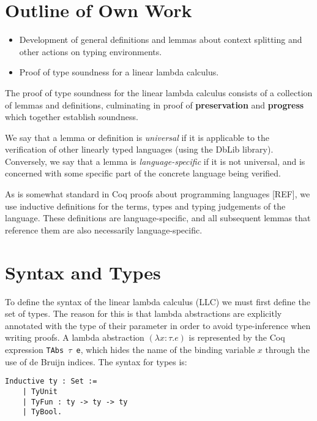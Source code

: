 \documentclass[]{unswthesis}
\let\c\texttt
\let\i\textit
\begin{document}
\section{Outline of Own Work}

\begin{itemize}
\item Development of general definitions and lemmas about context splitting and other actions on typing environments.
\item Proof of type soundness for a linear lambda calculus.
\end{itemize}

The proof of type soundness for the linear lambda calculus consists of a collection of lemmas and definitions, culminating in proof of \textbf{preservation} and \textbf{progress} which together establish soundness.

We say that a lemma or definition is \i{universal} if it is applicable to the verification of other linearly typed languages (using the DbLib library). Conversely, we say that a lemma is \i{language-specific} if it is not universal, and is concerned with some specific part of the concrete language being verified.

As is somewhat standard in Coq proofs about programming languages [REF], we use inductive definitions for the terms, types and typing judgements of the language. These definitions are language-specific, and all subsequent lemmas that reference them are also necessarily language-specific.


\section{Syntax and Types}

To define the syntax of the linear lambda calculus (LLC) we must first define the set of types. The reason for this is that lambda abstractions are explicitly annotated with the type of their parameter in order to avoid type-inference when writing proofs. A lambda abstraction $(\lambda x : \tau. e)$ is represented by the Coq expression \c{TAbs $\tau$ e}, which hides the name of the binding variable $x$ through the use of de Bruijn indices. The syntax for types is:

\begin{verbatim}
Inductive ty : Set :=
    | TyUnit
    | TyFun : ty -> ty -> ty
    | TyBool.
\end{verbatim}
\end{document}
